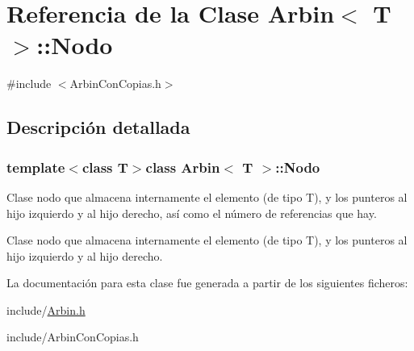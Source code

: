 \hypertarget{class_arbin_1_1_nodo}{
\section{\-Referencia de la \-Clase \-Arbin$<$ \-T $>$\-:\-:\-Nodo}
\label{class_arbin_1_1_nodo}
}


{\ttfamily \#include $<$\-Arbin\-Con\-Copias.\-h$>$}



\subsection{\-Descripción detallada}
\subsubsection*{template$<$class T$>$class Arbin$<$ T $>$\-::\-Nodo}

\-Clase nodo que almacena internamente el elemento (de tipo \-T), y los punteros al hijo izquierdo y al hijo derecho, así como el número de referencias que hay.

\-Clase nodo que almacena internamente el elemento (de tipo \-T), y los punteros al hijo izquierdo y al hijo derecho. 

\-La documentación para esta clase fue generada a partir de los siguientes ficheros\-:\begin{DoxyCompactItemize}
\item 
include/\hyperlink{_arbin_8h}{\-Arbin.\-h}\item 
include/\-Arbin\-Con\-Copias.\-h\end{DoxyCompactItemize}
